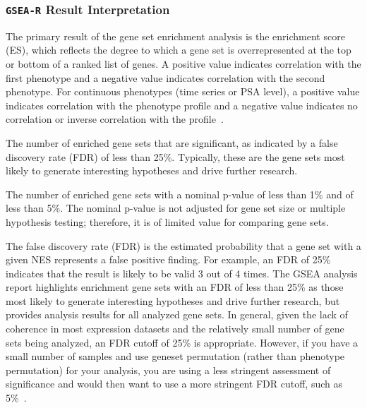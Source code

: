 \documentclass[a4paper]{article}
\begin{document}
\subsubsection{\texttt{GSEA-R} Result Interpretation}

The primary result of the gene set enrichment analysis is the enrichment score (ES), which reflects the degree to which a gene set is overrepresented at the top or bottom of a ranked list of genes. A positive value indicates correlation with the first phenotype and a negative value indicates correlation with the second phenotype.  For continuous phenotypes (time series or PSA level), a positive value indicates correlation with the phenotype profile and a negative value indicates no correlation or inverse correlation with the profile~\cite{Subramanian2005}.

The number of enriched gene sets that are significant, as indicated by a false discovery rate (FDR) of less than 25\%. Typically, these are the gene sets most likely to generate interesting hypotheses and drive further research.

The number of enriched gene sets with a nominal p-value of less than 1\% and of less than 5\%. The nominal p-value is not adjusted for gene set size or multiple hypothesis testing; therefore, it is of limited value for comparing gene sets.

The false discovery rate (FDR) is the estimated probability that a gene set with a given NES represents a false positive finding. For example, an FDR of 25\% indicates that the result is likely to be valid 3 out of 4 times. The GSEA analysis report highlights enrichment gene sets with an FDR of less than 25\% as those most likely to generate interesting hypotheses and drive further research, but provides analysis results for all analyzed gene sets. In general, given the lack of coherence in most expression datasets and the relatively small number of gene sets being analyzed, an FDR cutoff of 25\% is appropriate. However, if you have a small number of samples and use geneset permutation (rather than phenotype permutation) for your analysis, you are using a less stringent assessment of significance and would then want to use a more stringent FDR cutoff, such as 5\%~\cite{Subramanian2005}.

 
\end{document}
